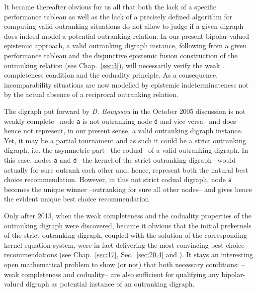 It became thereafter obvious for us all that both the lack of a specific performance tableau as well as the lack of a precisely defined algorithm for computing valid outranking situations do not allow to judge if a given digraph does indeed model a potential outranking relation. In our present bipolar-valued epistemic approach, a valid outranking digraph instance, following from a given performance tableau and the disjunctive epistemic fusion construction of the outranking relation (see Chap.~\ref{sec:3}), will necessarily verify the weak completeness condition and the coduality principle. As a consequence, incomparability situations are now modelled by epistemic indeterminateness not by the actual absence of a reciprocal outranking relation.

The digraph put forward by \emph{D. Bouyssou} in the October 2005 discussion is not weakly complete --node \texttt{a} is not outranking node \texttt{d} and vice versa-- and does hence not represent, in our present sense, a valid outranking digraph instance. Yet, it may be a partial tournament and as such it could be a strict outranking digraph, i.e. the asymmetric part --the codual-- of a valid outranking digraph. In this case, nodes \texttt{a} and \texttt{d} --the kernel of the strict outranking digraph-- would actually for sure outrank each other and, hence, represent both the natural best choice recommendation. However, in this not strict codual digraph, node \texttt{a} becomes the unique \Condorcet winner --outranking for sure all other nodes-- and gives hence the evident unique best choice recommendation.

Only after 2013, when the weak completeness and the coduality properties of the outranking digraph were discovered, became it obvious that the initial prekernels of the strict outranking digraph, coupled with the solution of the corresponding kernel equation system, were in fact delivering the most convincing best choice recommendations (see Chap.~\ref{sec:17}, Sec.~\ref{sec:20.4} and \citealp{BIS-2013}). It stays an interesting open mathematical problem to show (or not) that both necessary conditions: --weak completeness and coduality-- are also sufficient for qualifying any bipolar-valued digraph as potential instance of an outranking digraph.


%


